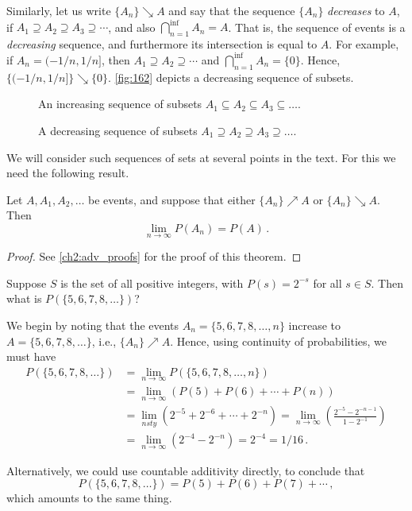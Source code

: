 Similarly, let us write $\{A_n\}\searrow A$ and say that the sequence $\{A_n\}$ \emph{decreases} to $A$, if $A_1\supseteq A_2\supseteq A_3 \supseteq\cdots$, and also $\bigcap_{n=1}^{\inf}A_n=A$. That is, the sequence of events is a \emph{decreasing} sequence, and furthermore its intersection is equal to $A$. For example, if $A_n=(-1/n,1/n]$, then $A_1\supseteq A_2 \supseteq \cdots$ and $\bigcap_{n=1}^{\inf}A_n=\{0\}$. Hence, $\{(-1/n,1/n]\}\searrow\{0\}$. \autoref{fig:162} depicts a decreasing sequence of subsets.
\begin{figure}
    \caption{An increasing sequence of subsets $A_1\subseteq A_2 \subseteq A_3 \subseteq \dots$.\label{fig:161}}
\end{figure}
\begin{figure}
    \caption{A decreasing sequence of subsets $A_1 \supseteq A_2 \supseteq A_3 \supseteq \dots$.\label{fig:162}}
\end{figure}
We will consider such sequences of sets at several points in the text. For this we need the following result.
\begin{theorem}
    Let $A,A_1, A_2, \ldots$ be events, and suppose that either $\{A_n\}\nearrow A$ or $\{A_n\}\searrow A$. Then
    $$
    \lim_{n\to\infty}P(A_n)=P(A)\,.
    $$
\end{theorem}
\begin{proof}
    See \autoref{ch2:adv_proofs} for the proof of this theorem.
\end{proof}
\begin{example}
    Suppose $S$ is the set of all positive integers, with $P(s)=2^{-s}$ for all $s\in S$. Then what is $P(\{5,6,7,8,\ldots\})$?

    We begin by noting that the events $A_n=\{5,6,7,8,\ldots,n\}$ increase to $A=\{5,6,7,8,\ldots\}$, i.e., $\{A_n\} \nearrow A$. Hence, using continuity of
    probabilities, we must have
    \begin{equation*}
        \begin{split}
            P(\{5,6 ,7,8,\ldots\}) & = \lim_{n\to\infty}P(\{5,6,7,8,\ldots,n\}) \\
                             & = \lim_{n\to\infty}\left( P(5)+P(6)+ \cdots + P(n)\right) \\
                             & = \lim_{nsty}\left( 2^{-5}+2^{-6}+\cdots+2^{-n}\right)=\lim_{n\to\infty}\left(\frac{2^{-5}-2^{-n-1}}{1-2^{-1}}\right) \\
                             & = \lim_{n\to\infty}\left(2^{-4}-2^{-n}\right)=2^{-4}=1/16\,.
        \end{split}
    \end{equation*}

    Alternatively, we could use countable additivity directly, to conclude that
    $$
    P(\{5,6,7,8,\ldots\})=P(5)+P(6)+P(7)+\cdots\,,
    $$
    which amounts to the same thing.
\end{example}

